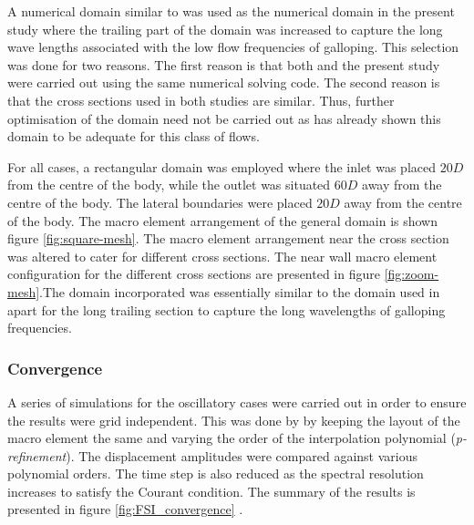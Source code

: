 A numerical domain similar to \citet{Leontini2013} was used  as the numerical domain in the present study where the trailing part of the domain was increased to capture the long wave lengths associated with the low flow frequencies of galloping. This selection was done for two reasons. The first reason is that both  \citet{Leontini2013} and the present study were carried out using the same numerical solving code. The second reason is that the cross sections used in both studies are similar. Thus, further optimisation of the domain need not be carried out as \citet{Leontini2013} has already shown this domain to be adequate for this class of flows.

For all cases, a rectangular domain was employed where the inlet was placed $20D$ from the centre of the body, while the outlet was situated $60D$ away from the centre of the body. The lateral boundaries were placed $20D$ away from the centre of the body. The macro element arrangement of the general domain is shown figure \ref{fig:square-mesh}. The macro element arrangement near the cross section was altered to cater for different cross sections. The near wall macro element configuration for the different cross sections are presented in figure \ref{fig:zoom-mesh}.The domain incorporated was essentially similar to the domain used in \citet{Leontini2013} apart for the long trailing section to capture the long wavelengths of galloping frequencies. 
 
 
 
 
 

\subsubsection{Convergence}

A series of simulations for the oscillatory cases were carried out in order to ensure the results were grid independent. This was done by by keeping the layout of the macro element the same and varying the order of the interpolation polynomial (\emph{p-refinement}). The displacement amplitudes were compared against various polynomial orders. The time step is also reduced as the spectral resolution increases to satisfy the Courant condition. The summary of the results is presented in figure \ref{fig:FSI_convergence} .



